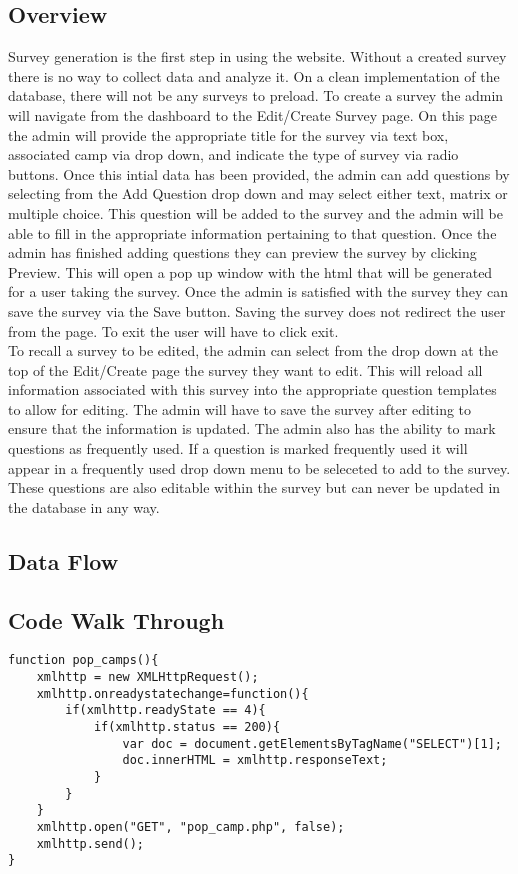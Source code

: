 \documentclass[../final.tex]{subfiles}
\begin{document}
\subsection{Overview}
Survey generation is the first step in using the website. Without a created 
survey there is no way to collect data and analyze it. On a clean implementation 
of the database, there will not be any surveys to preload. To create a survey the 
admin will navigate from the dashboard to the Edit/Create Survey page. On this page 
the admin will provide the appropriate title for the survey via text box, associated 
camp via drop down, and indicate the type of survey via radio buttons. Once this 
intial data has been provided, the admin can add questions by selecting from the 
Add Question drop down and may select either text, matrix or multiple choice. This 
question will be added to the survey and the admin will be able to fill in the 
appropriate information pertaining to that question. Once the admin has finished adding 
questions they can preview the survey by clicking Preview. This will open a pop up 
window with the html that will be generated for a user taking the survey. Once the admin 
is satisfied with the survey they can save the survey via the Save button. Saving the 
survey does not redirect the user from the page. To exit the user will have to click 
exit. \\
To recall a survey to be edited, the admin can select from the drop down at the top 
of the Edit/Create page the survey they want to edit. This will reload all information 
associated with this survey into the appropriate question templates to allow for 
editing. The admin will have to save the survey after editing to ensure that the 
information is updated. The admin also has the ability to mark questions as frequently 
used. If a question is marked frequently used it will appear in a frequently used 
drop down menu to be seleceted to add to the survey. These questions are also editable 
within the survey but can never be updated in the database in any way. \\ 
\subsection{Data Flow}
\subsection{Code Walk Through}
\begin{lstlisting}
function pop_camps(){
	xmlhttp = new XMLHttpRequest();
	xmlhttp.onreadystatechange=function(){
		if(xmlhttp.readyState == 4){
			if(xmlhttp.status == 200){
				var doc = document.getElementsByTagName("SELECT")[1];
				doc.innerHTML = xmlhttp.responseText;
			}	
		}	
	}
	xmlhttp.open("GET", "pop_camp.php", false);
	xmlhttp.send();
}
\end{lstlisting}
\end{document}
